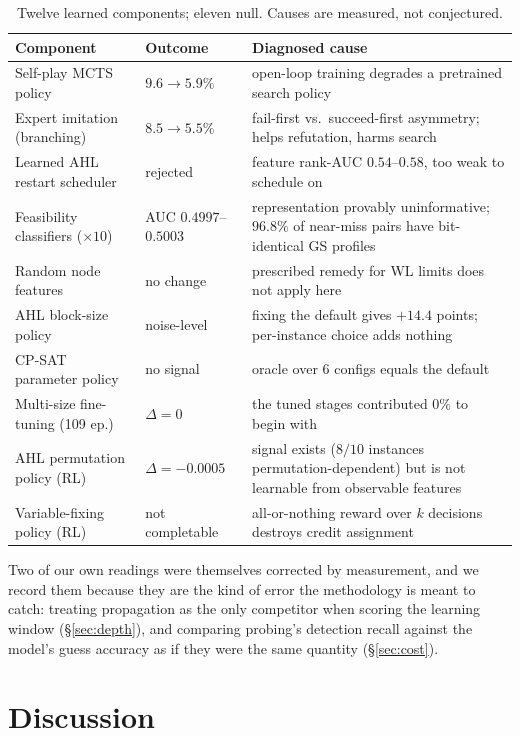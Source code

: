 \documentclass[12pt]{article}
\begin{document}
\begin{table}[h]
\centering
\small
\begin{tabular}{llp{6.6cm}}
\toprule
Component & Outcome & Diagnosed cause \\
\midrule
Self-play MCTS policy & $9.6\to5.9\%$ & open-loop training degrades a pretrained search policy \\
Expert imitation (branching) & $8.5\to5.5\%$ & fail-first vs.\ succeed-first asymmetry; helps refutation, harms search \\
Learned AHL restart scheduler & rejected & feature rank-AUC $0.54$--$0.58$, too weak to schedule on \\
Feasibility classifiers ($\times10$) & AUC $0.4997$--$0.5003$ & representation provably uninformative; $96.8\%$ of near-miss pairs have bit-identical GS profiles \citep{chen2023representing} \\
Random node features & no change & prescribed remedy for WL limits does not apply here \\
AHL block-size policy & noise-level & fixing the default gives $+14.4$ points; per-instance choice adds nothing \\
CP-SAT parameter policy & no signal & oracle over 6 configs equals the default \\
Multi-size fine-tuning (109 ep.) & $\Delta=0$ & the tuned stages contributed $0\%$ to begin with \\
AHL permutation policy (RL) & $\Delta=-0.0005$ & signal exists ($8/10$ instances permutation-dependent) but is not learnable from observable features \\
Variable-fixing policy (RL) & not completable & all-or-nothing reward over $k$ decisions destroys credit assignment \\
\bottomrule
\end{tabular}
\caption{Twelve learned components; eleven null. Causes are measured, not conjectured.}
\label{tab:negatives}
\end{table}

Two of our own readings were themselves corrected by measurement, and we record them because they are the kind of error the methodology is meant to catch: treating propagation as the only competitor when scoring the learning window (\S\ref{sec:depth}), and comparing probing's detection recall against the model's guess accuracy as if they were the same quantity (\S\ref{sec:cost}).

\section{Discussion}
\label{sec:discussion}
\end{document}
